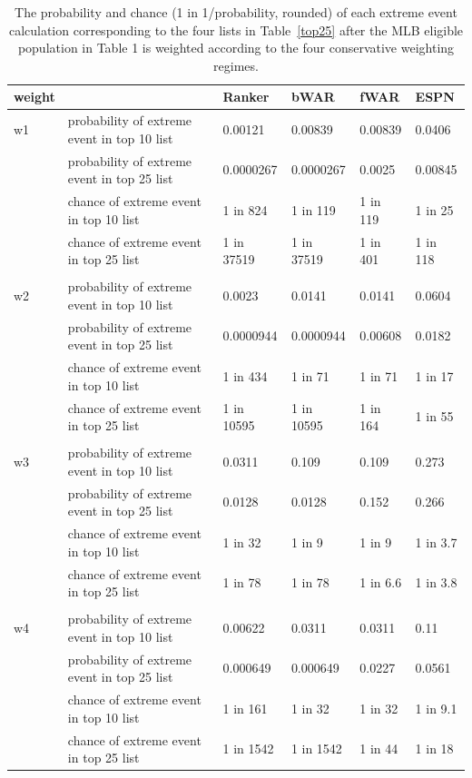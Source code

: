 \documentclass[11pt]{article}\usepackage[]{graphicx}\usepackage[]{color}
\begin{document}
\begin{table}[h!]
\begin{center}
\begin{tabular}{llllll}
\hline
 weight & &  Ranker  &  bWAR  &  fWAR  &  ESPN \\
 \hline
w1 & probability of extreme event in top 10 list 
  & 0.00121 
  & 0.00839 
  & 0.00839 
  & 0.0406 \\
& probability of extreme event in top 25 list 
  & 0.0000267 
  & 0.0000267 
  & 0.0025 
  & 0.00845 \\
& chance of extreme event in top 10 list 
  & 1 in 824 
  & 1 in 119 
  & 1 in 119 
  & 1 in 25 \\
& chance of extreme event in top 25 list 
  & 1 in 37519 
  & 1 in 37519 
  & 1 in 401 
  & 1 in 118 \\
  & & & & & \\
w2 & probability of extreme event in top 10 list 
  & 0.0023 
  & 0.0141 
  & 0.0141 
  & 0.0604 \\
& probability of extreme event in top 25 list 
  & 0.0000944 
  & 0.0000944 
  & 0.00608 
  & 0.0182 \\
& chance of extreme event in top 10 list 
  & 1 in 434 
  & 1 in 71 
  & 1 in 71 
  & 1 in 17 \\
& chance of extreme event in top 25 list 
  & 1 in 10595 
  & 1 in 10595 
  & 1 in 164 
  & 1 in 55 \\
  & & & & & \\
w3 & probability of extreme event in top 10 list 
  & 0.0311 
  & 0.109 
  & 0.109 
  & 0.273 \\
& probability of extreme event in top 25 list 
  & 0.0128 
  & 0.0128 
  & 0.152 
  & 0.266 \\
& chance of extreme event in top 10 list 
  & 1 in 32 
  & 1 in 9 
  & 1 in 9 
  & 1 in 3.7 \\
& chance of extreme event in top 25 list 
  & 1 in 78 
  & 1 in 78 
  & 1 in 6.6 
  & 1 in 3.8 \\
  & & & & & \\  
w4 & probability of extreme event in top 10 list 
  & 0.00622 
  & 0.0311 
  & 0.0311 
  & 0.11 \\
& probability of extreme event in top 25 list 
  & 0.000649 
  & 0.000649 
  & 0.0227 
  & 0.0561 \\
& chance of extreme event in top 10 list 
  & 1 in 161 
  & 1 in 32 
  & 1 in 32 
  & 1 in 9.1 \\
& chance of extreme event in top 25 list 
  & 1 in 1542 
  & 1 in 1542 
  & 1 in 44 
  & 1 in 18 \\
  \hline
\end{tabular}
\end{center}
\caption{The probability and chance (1 in 1/probability, rounded) 
  of each extreme event calculation corresponding to the four lists in 
  Table~\ref{top25} after the MLB eligible population in Table 1 is 
  weighted according to the four conservative weighting regimes.}
\label{probvalues.weights}
\end{table}
\end{document}
